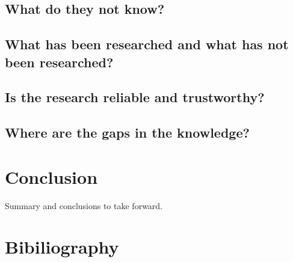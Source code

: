 \documentclass[a4paper, 11pt]{article}
\begin{document}
\subsection{What do they not know?}


\subsection{What has been researched and what has not been researched?}


\subsection{Is the research reliable and trustworthy?}


\subsection{Where are the gaps in the knowledge?}

\section{Conclusion}
Summary and conclusions to take forward.

\section{Bibiliography}

\end{document}
